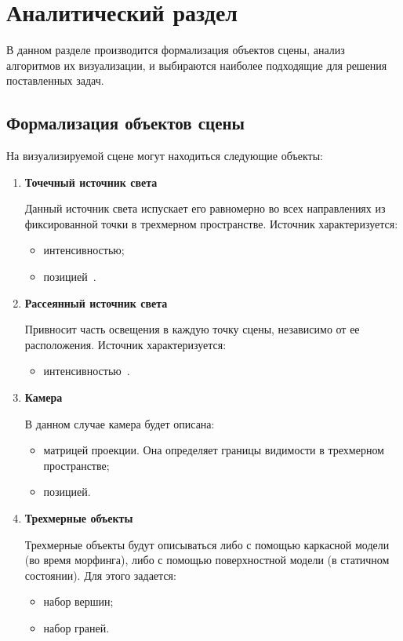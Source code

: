 \chapter{Аналитический раздел}

В данном разделе производится формализация объектов сцены, анализ алгоритмов их визуализации, и выбираются наиболее подходящие для решения поставленных задач.

\section[Формализация объектов синтезируемой сцены]{Формализация объектов сцены}
\label{sec:obj_formalasation}

На визуализируемой сцене могут находиться следующие объекты:
\begin{enumerate}
	\item \textbf{Точечный источник света}
	
	Данный источник света испускает его равномерно во всех направлениях из фиксированной точки в трехмерном пространстве.
	Источник характеризуется:
	\begin{itemize}
		\item интенсивностью;
		\item позицией~\cite{Gambetta}.
	\end{itemize}
	
	\item \textbf{Рассеянный источник света}
	
	Привносит часть освещения в каждую точку сцены, независимо от ее расположения. 
	Источник характеризуется:
	\begin{itemize}
		\item интенсивностью~\cite{Gambetta}.
	\end{itemize}
	
	\item \textbf{Камера}
	
	В данном случае камера будет описана:
	\begin{itemize}
		\item матрицей проекции. Она определяет границы видимости в трехмерном пространстве;
		\item позицией.
	\end{itemize}
	
	\item \textbf{Трехмерные объекты}
		
	Трехмерные объекты будут описываться либо с помощью каркасной модели (во время морфинга), либо с помощью поверхностной модели (в статичном состоянии).
	Для этого задается:
	\begin{itemize}
		\item набор вершин;
		\item набор граней.
	\end{itemize}
\end{enumerate}


